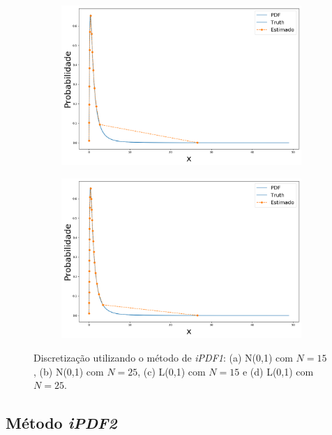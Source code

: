 \begin{figure}[H]
	\begin{subfigure}[b]{0.45\textwidth}
		\centering 
		\includegraphics[width=\linewidth]{./figuras/iPDF1_lognormal_15}
		\caption{}
		\label{fig:ipdflognorm15}
	\end{subfigure}
	\hfill
	\begin{subfigure}[b]{0.45\textwidth}
		\centering 
		\includegraphics[width=\linewidth]{./figuras/iPDF1_lognormal_25}
		\caption{}
		\label{fig:ipdflognorm25}
	\end{subfigure}
	
	\caption{Discretização utilizando o método de \textit{iPDF1}: (a) N(0,1) com $N = 15$, (b) N(0,1) com $N = 25$, (c) L(0,1) com $N = 15$ e (d) L(0,1) com $N = 25$.}
	\label{fig:ipdfmnorm}
\end{figure}



\subsection{Método \textit{iPDF2}}

